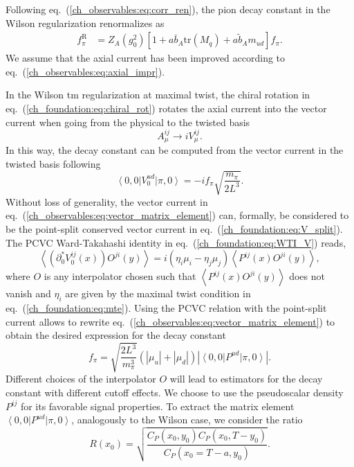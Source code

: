 Following eq.~(\ref{ch_observables:eq:corr_ren}), the pion decay constant in the Wilson regularization renormalizes as
\begin{align}
f_{\pi}^{\textrm{R}}&=Z_A(g_0^2)\left[1+a\bar{b}_A{\textrm{tr}}\left(M_q\right)+a\tilde{b}_Am_{ud}\right]f_{\pi}.
\end{align}
We assume that the axial current has been improved according to eq.~(\ref{ch_observables:eq:axial_impr}).

In the Wilson tm regularization at maximal twist, the chiral rotation in eq.~(\ref{ch_foundation:eq:chiral_rot}) rotates the axial current into the vector current when going from the physical to the twisted basis
\begin{equation}
A_{\mu}^{ij}\rightarrow iV_{\mu}^{ij}.
\end{equation}
In this way, the decay constant can be computed from the vector current in the twisted basis following
\begin{equation}
\label{ch_observables:eq:vector_matrix_element}
\left<0,0\right|V_0^{ud}\left|\pi,0\right>=-if_{\pi}\sqrt{\frac{m_{\pi}}{2L^3}}.
\end{equation}
Without loss of generality, the vector current in eq.~(\ref{ch_observables:eq:vector_matrix_element}) can, formally, be considered to be the point-split conserved vector current in eq.~(\ref{ch_foundation:eq:V_split}). The PCVC Ward-Takahashi identity in eq.~(\ref{ch_foundation:eq:WTI_V}) reads,
\begin{equation}
\left<\left(\partial_0^*V_0^{ij}(x)\right)O^{ji}(y)\right>=i\left(\eta_i\mu_i-\eta_{j}\mu_{j}\right)\left<P^{ij}(x)O^{ji}(y)\right>,
\end{equation}
where $O$ is any interpolator chosen such that $\left<P^{ij}(x)O^{ji}(y)\right>$ does not vanish and $\eta_i$ are given by the maximal twist condition in eq.~(\ref{ch_foundation:eq:mte}). Using the PCVC relation with the point-split current allows to rewrite eq.~(\ref{ch_observables:eq:vector_matrix_element}) to obtain the desired expression for the decay constant
\begin{equation}
\label{ch_observables:eq:f_OBC}
f_{\pi}=\sqrt{\frac{2L^3}{m_{\pi}^3}}\left(|\mu_u|+|\mu_{d}|\right)\left|\left<0,0\right|P^{ud}\left|\pi,0\right>\right|.
\end{equation}
Different choices of the interpolator $O$ will lead to estimators for the decay constant with different cutoff effects. We choose to use the pseudoscalar density $P^{ij}$ for its favorable signal properties. To extract the matrix element $\left<0,0\right|P^{ud}\left|\pi,0\right>$, analogously to the Wilson case, we consider the ratio
\begin{equation}
\label{ch_observables:eq:R_tm}
R(x_0)=\sqrt{\frac{C_P(x_0,y_0)C_P(x_0,T-y_0)}{C_P(x_0=T-a,y_0)}}.
\end{equation}

